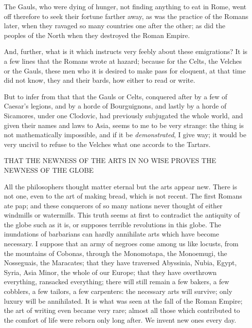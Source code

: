 The Gauls, who were dying of hunger, not finding anything to eat in
Rome, went off therefore to seek their fortune farther away, as was the
practice of the Romans later, when they ravaged so many countries one
after the other; as did the peoples of the North when they destroyed the
Roman Empire.

And, further, what is it which instructs very feebly about these
emigrations? It is a few lines that the Romans wrote at hazard; because
for the Celts, the Velches or the Gauls, these men who it is desired to
make pass for eloquent, at that time did not know, they and their bards,
how either to read or write.

But to infer from that that the Gauls or Celts, conquered after by a few
of Caesar's legions, and by a horde of Bourguignons, and lastly by a
horde of Sicamores, under one Clodovic, had previously subjugated the
whole world, and given their names and laws to Asia, seems to me to be
very strange: the thing is not mathematically impossible, and if it be
\textit{demonstrated}, I give way; it would be very uncivil to refuse to the
Velches what one accords to the Tartars.





\noindent
THAT THE NEWNESS OF THE ARTS IN NO WISE PROVES THE NEWNESS OF THE GLOBE


All the philosophers thought matter eternal but the arts appear new.
There is not one, even to the art of making bread, which is not recent.
The first Romans ate pap; and these conquerors of so many nations never
thought of either windmills or watermills. This truth seems at first to
contradict the antiquity of the globe such as it is, or supposes
terrible revolutions in this globe. The inundations of barbarians can
hardly annihilate arts which have become necessary. I suppose that an
army of negroes come among us like locusts, from the mountains of
Cobonas, through the Monomotapa, the Monoemugi, the Nosseguais, the
Maracates; that they have traversed Abyssinia, Nubia, Egypt, Syria, Asia
Minor, the whole of our Europe; that they have overthrown everything,
ransacked everything; there will still remain a few bakers, a few
cobblers, a few tailors, a few carpenters: the necessary arts will
survive; only luxury will be annihilated. It is what was seen at the
fall of the Roman Empire; the art of writing even became very rare;
almost all those which contributed to the comfort of life were reborn
only long after. We invent new ones every day.

